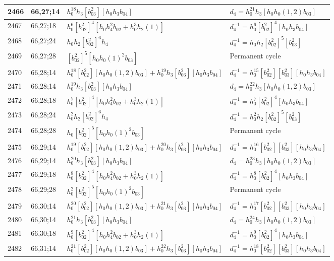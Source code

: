 \documentclass{article}
\begin{document}
\begin{longtable}{|l|l|>{\raggedright\arraybackslash}p{6cm}|>{\raggedright\arraybackslash}p{6cm}|}
2466 & 66,27;14 & $h_0^{18}h_3[b_{03}^2][h_0h_3b_{04}]$ &$d_{4}=h_0^{21}h_3[h_0h_0(1, 2)b_{03}]$\\
\hline
2467 & 66,27;18 & $h_0^6[b_{02}^2]^4[h_0h_4^2b_{02} + h_0^3h_2(1)]$ & $d_{4}^{-1}=h_0^6[b_{02}^2]^4[h_0h_3b_{04}]$\\
\hline
2468 & 66,27;24 & $h_0h_2[b_{02}^2]^6h_4$ & $d_{4}^{-1}=h_0h_2[b_{02}^2]^5[b_{03}^2]$\\
\hline
2469 & 66,27;28 & $[b_{02}^2]^5[h_0h_0(1)^2b_{03}]$ & Permanent cycle\\
\hline
2470 & 66,28;14 & $h_0^{18}[b_{02}^2][h_0h_0(1, 2)b_{03}] + h_0^{19}h_3[b_{03}^2][h_0h_3b_{04}]$ & $d_{4}^{-1}=h_0^{15}[b_{02}^2][b_{03}^2][h_0h_3b_{04}]$\\
2471 & 66,28;14 & $h_0^{19}h_3[b_{03}^2][h_0h_3b_{04}]$ &$d_{4}=h_0^{22}h_3[h_0h_0(1, 2)b_{03}]$\\
\hline
2472 & 66,28;18 & $h_0^7[b_{02}^2]^4[h_0h_4^2b_{02} + h_0^3h_2(1)]$ & $d_{4}^{-1}=h_0^7[b_{02}^2]^4[h_0h_3b_{04}]$\\
\hline
2473 & 66,28;24 & $h_0^2h_2[b_{02}^2]^6h_4$ & $d_{4}^{-1}=h_0^2h_2[b_{02}^2]^5[b_{03}^2]$\\
\hline
2474 & 66,28;28 & $h_0[b_{02}^2]^5[h_0h_0(1)^2b_{03}]$ & Permanent cycle\\
\hline
2475 & 66,29;14 & $h_0^{19}[b_{02}^2][h_0h_0(1, 2)b_{03}] + h_0^{20}h_3[b_{03}^2][h_0h_3b_{04}]$ & $d_{4}^{-1}=h_0^{16}[b_{02}^2][b_{03}^2][h_0h_3b_{04}]$\\
2476 & 66,29;14 & $h_0^{20}h_3[b_{03}^2][h_0h_3b_{04}]$ &$d_{4}=h_0^{23}h_3[h_0h_0(1, 2)b_{03}]$\\
\hline
2477 & 66,29;18 & $h_0^8[b_{02}^2]^4[h_0h_4^2b_{02} + h_0^3h_2(1)]$ & $d_{4}^{-1}=h_0^8[b_{02}^2]^4[h_0h_3b_{04}]$\\
\hline
2478 & 66,29;28 & $h_0^2[b_{02}^2]^5[h_0h_0(1)^2b_{03}]$ & Permanent cycle\\
\hline
2479 & 66,30;14 & $h_0^{20}[b_{02}^2][h_0h_0(1, 2)b_{03}] + h_0^{21}h_3[b_{03}^2][h_0h_3b_{04}]$ & $d_{4}^{-1}=h_0^{17}[b_{02}^2][b_{03}^2][h_0h_3b_{04}]$\\
2480 & 66,30;14 & $h_0^{21}h_3[b_{03}^2][h_0h_3b_{04}]$ &$d_{4}=h_0^{24}h_3[h_0h_0(1, 2)b_{03}]$\\
\hline
2481 & 66,30;18 & $h_0^9[b_{02}^2]^4[h_0h_4^2b_{02} + h_0^3h_2(1)]$ & $d_{4}^{-1}=h_0^9[b_{02}^2]^4[h_0h_3b_{04}]$\\
\hline
2482 & 66,31;14 & $h_0^{21}[b_{02}^2][h_0h_0(1, 2)b_{03}] + h_0^{22}h_3[b_{03}^2][h_0h_3b_{04}]$ & $d_{4}^{-1}=h_0^{18}[b_{02}^2][b_{03}^2][h_0h_3b_{04}]$\\

\end{longtable}
\end{document}
